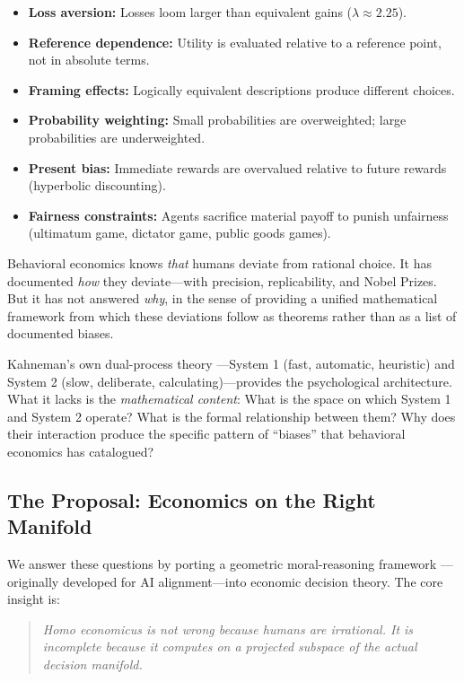 \documentclass[12pt]{article}
\theoremstyle{definition}
\theoremstyle{remark}
\begin{document}
\begin{itemize}
    \item \textbf{Loss aversion:} Losses loom larger than equivalent gains ($\lambda \approx 2.25$).
    \item \textbf{Reference dependence:} Utility is evaluated relative to a reference point, not in absolute terms.
    \item \textbf{Framing effects:} Logically equivalent descriptions produce different choices.
    \item \textbf{Probability weighting:} Small probabilities are overweighted; large probabilities are underweighted.
    \item \textbf{Present bias:} Immediate rewards are overvalued relative to future rewards (hyperbolic discounting).
    \item \textbf{Fairness constraints:} Agents sacrifice material payoff to punish unfairness (ultimatum game, dictator game, public goods games).
\end{itemize}

Behavioral economics knows \emph{that} humans deviate from rational choice.  It has documented \emph{how} they deviate---with precision, replicability, and Nobel Prizes.  But it has not answered \emph{why}, in the sense of providing a unified mathematical framework from which these deviations follow as theorems rather than as a list of documented biases.

Kahneman's own dual-process theory \cite{kahneman2011}---System 1 (fast, automatic, heuristic) and System 2 (slow, deliberate, calculating)---provides the psychological architecture.  What it lacks is the \emph{mathematical content}: What is the space on which System 1 and System 2 operate?  What is the formal relationship between them?  Why does their interaction produce the specific pattern of ``biases'' that behavioral economics has catalogued?

\subsection{The Proposal: Economics on the Right Manifold}

We answer these questions by porting a geometric moral-reasoning framework \cite{bond2026geometric}---originally developed for AI alignment---into economic decision theory.  The core insight is:

\begin{quote}
\emph{Homo economicus is not wrong because humans are irrational.  It is incomplete because it computes on a projected subspace of the actual decision manifold.}
\end{quote}
\end{document}
